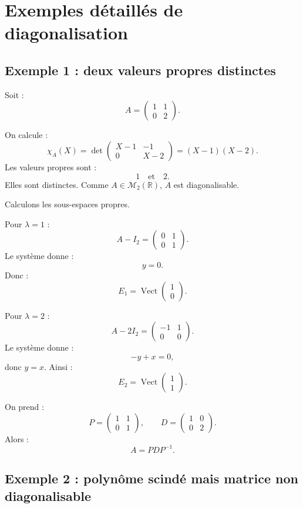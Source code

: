 \documentclass[11pt,a4paper]{article}
\newcommand{\R}{\mathbb R}
\newcommand{\M}{\mathcal M}
\newcommand{\Vect}{\operatorname{Vect}}
\begin{document}
\section{Exemples détaillés de diagonalisation}

\subsection{Exemple 1 : deux valeurs propres distinctes}

Soit :
\[
A=
\begin{pmatrix}
1&1\\
0&2
\end{pmatrix}.
\]

On calcule :
\[
\chi_A(X)
=
\det
\begin{pmatrix}
X-1&-1\\
0&X-2
\end{pmatrix}
=
(X-1)(X-2).
\]
Les valeurs propres sont :
\[
1\quad\text{et}\quad 2.
\]
Elles sont distinctes. Comme \(A\in\M_2(\R)\), \(A\) est diagonalisable.

Calculons les sous-espaces propres.

Pour \(\lambda=1\) :
\[
A-I_2=
\begin{pmatrix}
0&1\\
0&1
\end{pmatrix}.
\]
Le système donne :
\[
y=0.
\]
Donc :
\[
E_1=\Vect
\begin{pmatrix}
1\\0
\end{pmatrix}.
\]

Pour \(\lambda=2\) :
\[
A-2I_2=
\begin{pmatrix}
-1&1\\
0&0
\end{pmatrix}.
\]
Le système donne :
\[
-y+x=0,
\]
donc \(y=x\). Ainsi :
\[
E_2=\Vect
\begin{pmatrix}
1\\1
\end{pmatrix}.
\]

On prend :
\[
P=
\begin{pmatrix}
1&1\\
0&1
\end{pmatrix},
\qquad
D=
\begin{pmatrix}
1&0\\
0&2
\end{pmatrix}.
\]
Alors :
\[
A=PDP^{-1}.
\]

\subsection{Exemple 2 : polynôme scindé mais matrice non diagonalisable}
\end{document}
